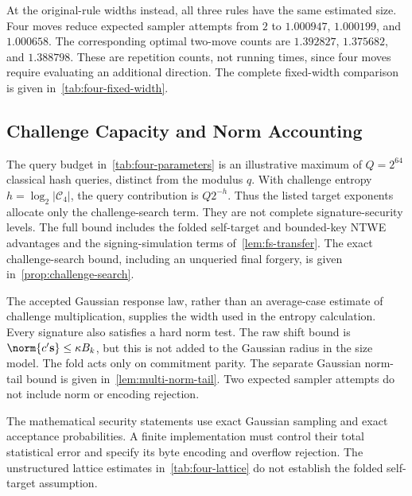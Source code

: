 At the original-rule widths instead, all three rules have the same estimated size. Four moves reduce expected sampler attempts from $2$ to $1.000947$, $1.000199$, and $1.000658$. The corresponding optimal two-move counts are $1.392827$, $1.375682$, and $1.388798$. These are repetition counts, not running times, since four moves require evaluating an additional direction. The complete fixed-width comparison is given in~\cref{tab:four-fixed-width}.

\subsection{Challenge Capacity and Norm Accounting}

The query budget in~\cref{tab:four-parameters} is an illustrative maximum of $Q=2^{64}$ classical hash queries, distinct from the modulus $q$. With challenge entropy $h=\log_2|\mathcal C_4|$, the query contribution is $Q2^{-h}$. Thus the listed target exponents allocate only the challenge-search term. They are not complete signature-security levels. The full bound includes the folded self-target and bounded-key NTWE advantages and the signing-simulation terms of~\cref{lem:fs-transfer}. The exact challenge-search bound, including an unqueried final forgery, is given in~\cref{prop:challenge-search}.

The accepted Gaussian response law, rather than an average-case estimate of challenge multiplication, supplies the width used in the entropy calculation. Every signature also satisfies a hard norm test. The raw shift bound is $\norm{c'\vec s}\le\kappa B_k$, but this is not added to the Gaussian radius in the size model. The fold acts only on commitment parity. The separate Gaussian norm-tail bound is given in~\cref{lem:multi-norm-tail}. Two expected sampler attempts do not include norm or encoding rejection.

The mathematical security statements use exact Gaussian sampling and exact acceptance probabilities. A finite implementation must control their total statistical error and specify its byte encoding and overflow rejection. The unstructured lattice estimates in~\cref{tab:four-lattice} do not establish the folded self-target assumption.
